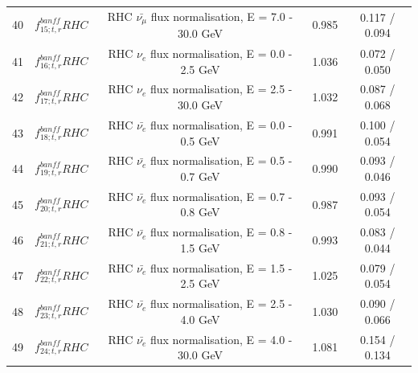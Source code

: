 \begin{tabular} { | c | c | c | c | c |  }
40 & $f_{15; t, r}^{banff} RHC$ & RHC $\bar{\nu_\mu}$ flux normalisation, E = 7.0 - 30.0 GeV & 0.985 & 0.117 / 0.094\\ 
41 & $f_{16; t, r}^{banff} RHC$ & RHC $\nu_e$ flux normalisation, E = 0.0 - 2.5 GeV & 1.036 & 0.072 / 0.050\\ 
42 & $f_{17; t, r}^{banff} RHC$ & RHC $\nu_e$ flux normalisation, E = 2.5 - 30.0 GeV & 1.032 & 0.087 / 0.068\\ 
43 & $f_{18; t, r}^{banff} RHC$ & RHC $\bar{\nu_e}$ flux normalisation, E = 0.0 - 0.5 GeV & 0.991 & 0.100 / 0.054\\ 
44 & $f_{19; t, r}^{banff} RHC$ & RHC $\bar{\nu_e}$ flux normalisation, E = 0.5 - 0.7 GeV & 0.990 & 0.093 / 0.046\\ 
45 & $f_{20; t, r}^{banff} RHC$ & RHC $\bar{\nu_e}$ flux normalisation, E = 0.7 - 0.8 GeV & 0.987 & 0.093 / 0.054\\ 
46 & $f_{21; t, r}^{banff} RHC$ & RHC $\bar{\nu_e}$ flux normalisation, E = 0.8 - 1.5 GeV & 0.993 & 0.083 / 0.044\\ 
47 & $f_{22; t, r}^{banff} RHC$ & RHC $\bar{\nu_e}$ flux normalisation, E = 1.5 - 2.5 GeV & 1.025 & 0.079 / 0.054\\ 
48 & $f_{23; t, r}^{banff} RHC$ & RHC $\bar{\nu_e}$ flux normalisation, E = 2.5 - 4.0 GeV & 1.030 & 0.090 / 0.066\\ 
49 & $f_{24; t, r}^{banff} RHC$ & RHC $\bar{\nu_e}$ flux normalisation, E = 4.0 - 30.0 GeV & 1.081 & 0.154 / 0.134\\ 

\hline

\end{tabular}